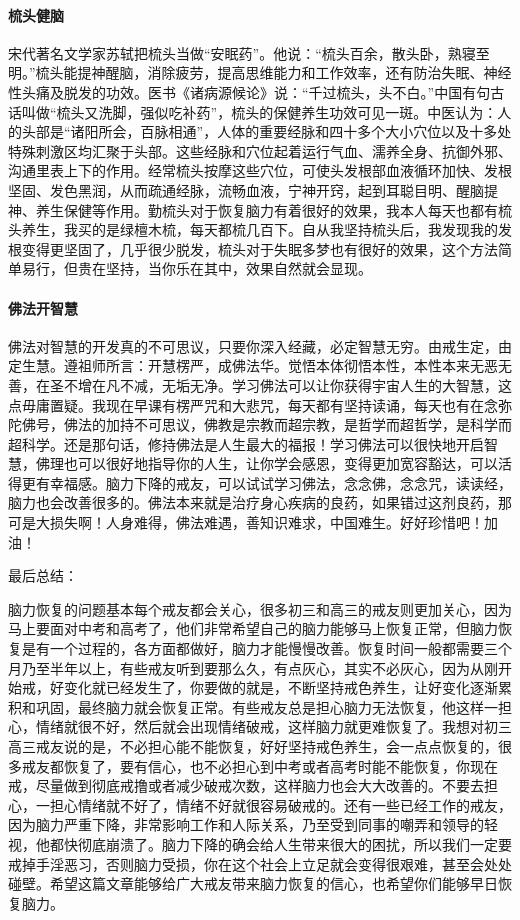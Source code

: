 \documentclass{ctexart}
\begin{document}
\paragraph{梳头健脑} 宋代著名文学家苏轼把梳头当做“安眠药”。他说：“梳头百余，散头卧，熟寝至明。”梳头能提神醒脑，消除疲劳，提高思维能力和工作效率，还有防治失眠、神经性头痛及脱发的功效。医书《诸病源候论》说：“千过梳头，头不白。”中国有句古话叫做“梳头又洗脚，强似吃补药”，梳头的保健养生功效可见一斑。中医认为：人的头部是“诸阳所会，百脉相通”，人体的重要经脉和四十多个大小穴位以及十多处特殊刺激区均汇聚于头部。这些经脉和穴位起着运行气血、濡养全身、抗御外邪、沟通里表上下的作用。经常梳头按摩这些穴位，可使头发根部血液循环加快、发根坚固、发色黑润，从而疏通经脉，流畅血液，宁神开窍，起到耳聪目明、醒脑提神、养生保健等作用。勤梳头对于恢复脑力有着很好的效果，我本人每天也都有梳头养生，我买的是绿檀木梳，每天都梳几百下。自从我坚持梳头后，我发现我的发根变得更坚固了，几乎很少脱发，梳头对于失眠多梦也有很好的效果，这个方法简单易行，但贵在坚持，当你乐在其中，效果自然就会显现。

\paragraph{佛法开智慧} 佛法对智慧的开发真的不可思议，只要你深入经藏，必定智慧无穷。由戒生定，由定生慧。遵祖师所言：开慧楞严，成佛法华。觉悟本体彻悟本性，本性本来无恶无善，在圣不增在凡不减，无垢无净。学习佛法可以让你获得宇宙人生的大智慧，这点毋庸置疑。我现在早课有楞严咒和大悲咒，每天都有坚持读诵，每天也有在念弥陀佛号，佛法的加持不可思议，佛教是宗教而超宗教，是哲学而超哲学，是科学而超科学。还是那句话，修持佛法是人生最大的福报！学习佛法可以很快地开启智慧，佛理也可以很好地指导你的人生，让你学会感恩，变得更加宽容豁达，可以活得更有幸福感。脑力下降的戒友，可以试试学习佛法，念念佛，念念咒，读读经，脑力也会改善很多的。佛法本来就是治疗身心疾病的良药，如果错过这剂良药，那可是大损失啊！人身难得，佛法难遇，善知识难求，中国难生。好好珍惜吧！加油！

最后总结：

脑力恢复的问题基本每个戒友都会关心，很多初三和高三的戒友则更加关心，因为马上要面对中考和高考了，他们非常希望自己的脑力能够马上恢复正常，但脑力恢复是有一个过程的，各方面都做好，脑力才能慢慢改善。恢复时间一般都需要三个月乃至半年以上，有些戒友听到要那么久，有点灰心，其实不必灰心，因为从刚开始戒，好变化就已经发生了，你要做的就是，不断坚持戒色养生，让好变化逐渐累积和巩固，最终脑力就会恢复正常。有些戒友总是担心脑力无法恢复，他这样一担心，情绪就很不好，然后就会出现情绪破戒，这样脑力就更难恢复了。我想对初三高三戒友说的是，不必担心能不能恢复，好好坚持戒色养生，会一点点恢复的，很多戒友都恢复了，要有信心，也不必担心到中考或者高考时能不能恢复，你现在戒，尽量做到彻底戒撸或者减少破戒次数，这样脑力也会大大改善的。不要去担心，一担心情绪就不好了，情绪不好就很容易破戒的。还有一些已经工作的戒友，因为脑力严重下降，非常影响工作和人际关系，乃至受到同事的嘲弄和领导的轻视，他都快彻底崩溃了。脑力下降的确会给人生带来很大的困扰，所以我们一定要戒掉手淫恶习，否则脑力受损，你在这个社会上立足就会变得很艰难，甚至会处处碰壁。希望这篇文章能够给广大戒友带来脑力恢复的信心，也希望你们能够早日恢复脑力。
\end{document}
